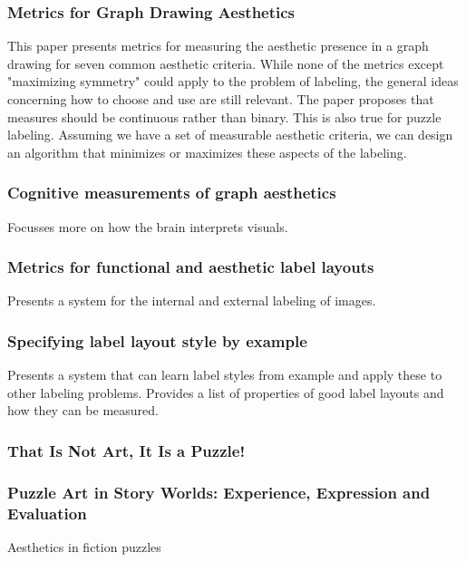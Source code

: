 \documentclass[a4paper]{article}
\begin{document}
\subsubsection{Metrics for Graph Drawing Aesthetics \cite{purchase2002metrics}}
This paper presents metrics for measuring the aesthetic presence in a graph drawing for seven common aesthetic criteria. While none of the metrics except "maximizing symmetry" could apply to the problem of labeling, the general ideas concerning how to choose and use are still relevant. The paper proposes that measures should be continuous rather than binary. This is also true for puzzle labeling. Assuming we have a set of measurable aesthetic criteria, we can design an algorithm that minimizes or maximizes these aspects of the labeling.\\

\subsubsection{Cognitive measurements of graph aesthetics \cite{ware2002cognitive}}
Focusses more on how the brain interprets visuals. \\

\subsubsection{Metrics for functional and aesthetic label layouts \cite{hartmann2005metrics}}
Presents a system for the internal and external labeling of images. \\

\subsubsection{Specifying label layout style by example \cite{vollick2007specifying}}
Presents a system that can learn label styles from example and apply these to other labeling problems. Provides a list of properties of good label layouts and how they can be measured.

\subsubsection{That Is Not Art, It Is a Puzzle! \cite{van2019not}}

\subsubsection{Puzzle Art in Story Worlds: Experience, Expression and Evaluation \cite{karhulahti2012puzzle}}
Aesthetics in fiction puzzles
\end{document}

